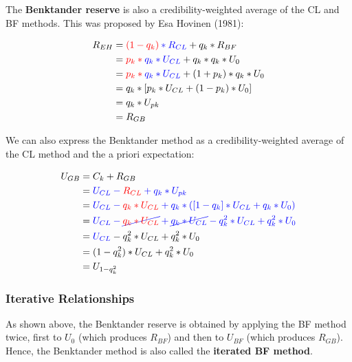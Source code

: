 \documentclass{article}
\begin{document}
The \textbf{Benktander reserve} is also a credibility-weighted average of the CL
and BF methods. This was proposed by Esa Hovinen (1981):

\begin{equation}
  \begin{aligned}
    R_{EH} &= \color{red}(1-q_k) \color{blue}* R_{CL} \color{black}+
    q_k * R_{BF} \\
    &= \color{red}p_k * \color{blue}q_k * U_{CL} \color{black}+ q_k *
    q_k * U_0 \\
    &= \color{red}p_k * \color{blue}q_k * U_{CL} \color{black}+
    (1+p_k) * q_k * U_0 \\
    &= q_k * [p_k * U_{CL} + (1-p_k) * U_0] \\
    &= q_k * U_{pk} \\
    &= R_{GB}
  \end{aligned}
\end{equation}

We can also express the Benktander method as a credibility-weighted average of
the CL method and the a priori expectation:

\begin{equation}
  \begin{aligned}
    U_{GB} &= C_k  + R_{GB} \\
    &= \color{blue}{U_{CL} - \color{red}R_{CL}}  + q_k * U_{pk} \\
    &= \color{blue}{U_{CL} - \color{red}q_k * U_{CL}}  + q_k *
    ([1-q_k] * U_{CL} + q_k * U_0) \\
    &= \color{blue}{U_{CL} - \cancel{\color{red}q_k * U_{CL}}}  +
    \cancel{q_k * U_{CL}} - q_k^2 * U_{CL} + q_k^2 * U_0 \\
    &= \color{blue}{U_{CL}}   \color{black}- q_k^2 * U_{CL} + q_k^2 * U_0 \\
    &= (1-q_k^2) * U_{CL} + q_k^2 * U_0 \\
    &= U_{1-q_k^2}
  \end{aligned}
\end{equation}

\subsubsection{Iterative Relationships}

As shown above, the Benktander reserve is obtained by applying the BF method
twice, first to $U_0$ (which produces $R_{BF}$) and then to $U_{BF}$ (which
produces $R_{GB}$). Hence, the Benktander method is also called the \textbf{
iterated BF method}.
\end{document}
